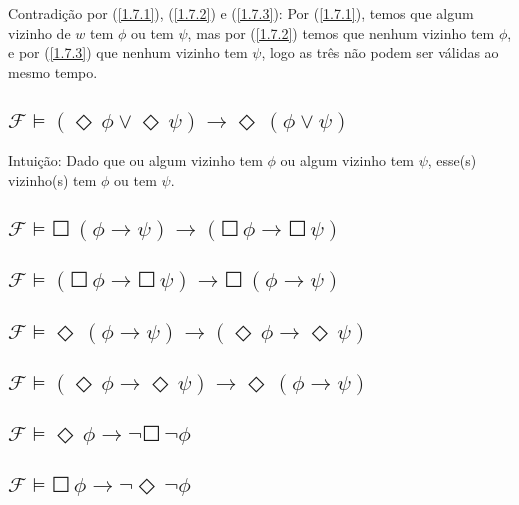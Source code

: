 \documentclass[11pt]{article}
\newcommand{\sq}{\Square \,}
\newcommand{\di}{\Diamond \,}
\newcommand{\imp}{\rightarrow}
\newcommand{\F}{\mathcal{F}}
\begin{document}
Contradição por (\ref{1.7.1}), (\ref{1.7.2})  e (\ref{1.7.3}): Por (\ref{1.7.1}), temos que algum vizinho de $w$ tem $\phi$ ou tem $\psi$, mas por (\ref{1.7.2}) temos que nenhum vizinho tem $\phi$, e por (\ref{1.7.3}) que nenhum vizinho tem $\psi$, logo as três não podem ser válidas ao mesmo tempo.



\subsection{$ \F\models ( \di \phi \lor \di \psi ) \imp \di ( \phi \lor \psi ) $}
Intuição: Dado que ou algum vizinho tem $\phi$ ou algum vizinho tem $\psi$, esse(s) vizinho(s) tem $\phi$ ou tem $\psi$.




\subsection{$ \F\models \sq ( \phi \imp \psi ) \imp ( \sq \phi \imp \sq \psi ) $}




\subsection{$ \F\models ( \sq \phi \imp \sq \psi ) \imp \sq ( \phi \imp \psi ) $}




\subsection{$ \F\models \di ( \phi \imp \psi ) \imp ( \di \phi \imp \di \psi ) $}




\subsection{$ \F\models ( \di \phi \imp \di \psi ) \imp \di ( \phi \imp \psi ) $}




\subsection{$ \F\models \di \phi \imp \lnot \sq \lnot \phi $}




\subsection{$ \F\models \sq \phi \imp \lnot \di \lnot \phi $}
\end{document}
